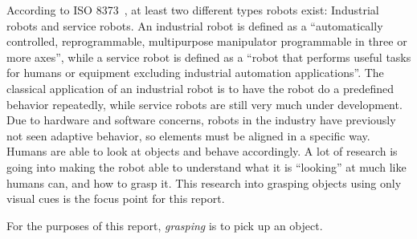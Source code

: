 According to ISO 8373~\cite{iso8373}, at least two different types robots exist:
Industrial robots and service robots.
An industrial robot is defined as a ``automatically controlled, reprogrammable, multipurpose manipulator programmable in three or more axes'',
while a service robot is defined as a ``robot that performs useful tasks for humans or equipment excluding industrial automation applications''.
The classical application of an industrial robot is to have the robot do a predefined behavior repeatedly,
while service robots are still very much under development.
Due to hardware and software concerns, robots in the industry have previously not seen adaptive behavior,
so elements must be aligned in a specific way. Humans are able to look at objects and behave accordingly.
A lot of research is going into making the robot able to understand what it is ``looking'' at much like humans can,
and how to grasp it. This research into grasping objects using only visual cues is the focus point for this report.

For the purposes of this report, \emph{grasping} is to pick up an object.
